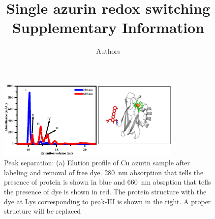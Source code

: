 \documentclass[11pt,a4paper,onecolumn]{article}
\newcommand*{\affaddr}[1]{#1} %
\newcommand*{\email}[1]{\texttt{#1}} %
\begin{document}
\author{Authors
}

\date{\vspace{1ex}} %

\title{\textbf{Single azurin redox switching}\\ \vspace{3ex} Supplementary Information{} \vspace{3ex}}

\maketitle
\tableofcontents
\pagebreak
\begin{figure}
  \centering
  \includegraphics[width=0.8\textwidth]{peak_separation}
  \makeatletter
  \renewcommand{\fnum@figure}{\figurename~S\thefigure}
  \makeatother
  \caption{Peak separation: (a) Elution profile of Cu azurin sample after labeling and removal of free dye.
  \SI{280}{\nm} absorption that tells the presence of protein is shown in blue and \SI{660}{\nm} absrption that tells the presence of  dye is shown in red.
  The protein structure with the dye at Lys corresponding to peak-III is shown in the right. 
  {A proper structure will be replaced}}
  \label{SIfig: peak_sep}
\end{figure}
\end{document}
